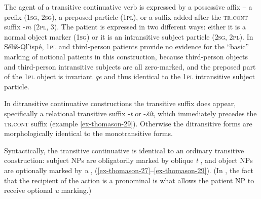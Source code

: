 \documentclass[output=paper,colorlinks,citecolor=brown]{langscibook}
\begin{document}
The agent of a transitive continuative verb is expressed by a
possessive affix -- a prefix (\textsc{1sg}, \textsc{2sg}), a preposed particle (\textsc{1pl}),
or a suffix added after the \textsc{tr.cont} suffix -\emph{m} (\textsc{2pl},
3).  The patient is expressed in two different ways: either it is a
normal object marker (\textsc{1sg}) or it is an intransitive subject particle
(\textsc{2sg}, \textsc{2pl}).  In S\'eli\v{s}-Ql'isp\'e, \textsc{1pl} and third-person patients
provide no evidence for the ``basic'' marking of notional patients in
this construction, because third-person objects and third-person
intransitive subjects are all zero-marked, and the preposed part of
the \textsc{1pl} object is invariant \emph{qe} and thus identical to the \textsc{1pl}
intransitive subject particle.

In ditransitive continuative constructions the transitive suffix does
appear, specifically a relational transitive suffix -\emph{{\textltilde}t} or 
-\emph{\v{s}\'it}, which immediately precedes the \textsc{tr.cont} suffix 
(example \ref{ex-thomason-29}).  Otherwise the ditransitive forms are 
morphologically identical to the monotransitive forms.\largerpage

Syntactically, the transitive continuative is identical to an ordinary
transitive construction: subject NPs are obligatorily marked by
oblique \emph{t} ,  and object NPs are 
optionally marked by \emph{{\textltilde}u} , 
(\ref{ex-thomason-27}--\ref{ex-thomason-29}).  (In , the 
fact that the recipient of the action is a pronominal is what allows the patient 
NP to receive optional \emph{{\textltilde}u} marking.)
\end{document}
